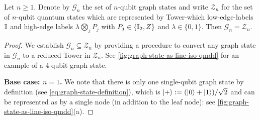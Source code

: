 \begin{proposition}
    \label{thm:graph-states-z-limdd}
    Let $n\geq 1$.
    Denote by $\mathcal{G}_n$ the set of $n$-qubit graph states and write $\mathcal{Z}_n$ for the set of $n$-qubit quantum states which are represented by Tower-\limdds which low-edge-labels $\id$ and high-edge labels $\lambda \bigotimes_j P_j$ with $P_j \in \{\id[2], Z\}$ and $\lambda \in \{0, 1\}$.
    Then $\mathcal{G}_n = \mathcal{Z}_n$.
\end{proposition}
\begin{proof}
    We establish $\mathcal{G}_n \subseteq \mathcal{Z}_n$ by providing a procedure to convert any graph state in $\mathcal{G}_n$ to a reduced Tower-\limdd in $\mathcal{Z}_n$.
	See \autoref{fig:graph-state-as-line-iso-qmdd} for an example of a $4$-qubit graph state.
	
	\textbf{Base case: $n=1$.} We note that there is only one single-qubit graph state by definition (see \autoref{eq:graph-state-definition}), which is \mbox{$\ket{+} := (\ket{0} + \ket{1}) / \sqrt{2}$} and can be represented as \limdd by a single node (in addition to the leaf node): see \autoref{fig:graph-state-as-line-iso-qmdd}(a).
	

\end{proof}
